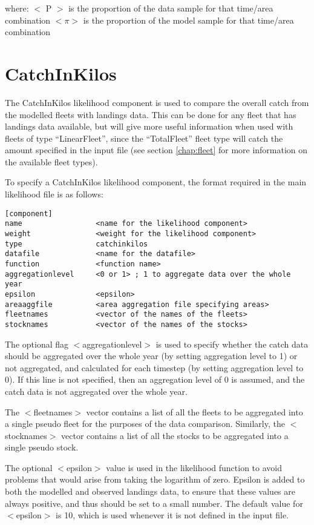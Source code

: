 \documentclass[]{book}
\begin{document}
where: \(<\) P \(>\) is the proportion of the data sample for that time/area
combination \(<\pi>\) is the proportion of the model sample for that
time/area combination

\hypertarget{sec:catchinkilos}{%
\section{CatchInKilos}\label{sec:catchinkilos}}

The CatchInKilos likelihood component is used to compare the overall
catch from the modelled fleets with landings data. This can be done for
any fleet that has landings data available, but will give more useful
information when used with fleets of type ``LinearFleet'', since the
``TotalFleet'' fleet type will catch the amount specified in the input
file (see section \ref{chap:fleet} for more information on the available fleet
types).

To specify a CatchInKilos likelihood component, the format required in
the main likelihood file is as follows:

\begin{verbatim}
[component]
name                 <name for the likelihood component>
weight               <weight for the likelihood component>
type                 catchinkilos
datafile             <name for the datafile>
function             <function name>
aggregationlevel     <0 or 1> ; 1 to aggregate data over the whole year
epsilon              <epsilon>
areaaggfile          <area aggregation file specifying areas>
fleetnames           <vector of the names of the fleets>
stocknames           <vector of the names of the stocks>
\end{verbatim}

The optional flag \(<\)aggregationlevel\(>\) is used to specify whether the
catch data should be aggregated over the whole year (by setting
aggregation level to 1) or not aggregated, and calculated for each
timestep (by setting aggregation level to 0). If this line is not
specified, then an aggregation level of 0 is assumed, and the catch data
is not aggregated over the whole year.

The \(<\)fleetnames\(>\) vector contains a list of all the fleets to be
aggregated into a single pseudo fleet for the purposes of the data
comparison. Similarly, the \(<\)stocknames\(>\) vector contains a list of
all the stocks to be aggregated into a single pseudo stock.

The optional \(<\)epsilon\(>\) value is used in the likelihood function to
avoid problems that would arise from taking the logarithm of zero.
Epsilon is added to both the modelled and observed landings data, to
ensure that these values are always positive, and thus should be set to
a small number. The default value for \(<\)epsilon\(>\) is 10, which is used
whenever it is not defined in the input file.
\end{document}
